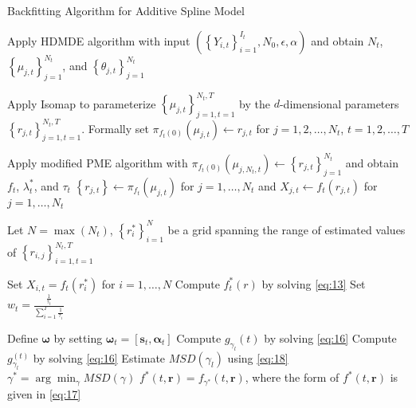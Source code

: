 \documentclass[11pt,reqno]{article}
\theoremstyle{definition}
\begin{document}
\begin{algorithm}
\caption{Backfitting Algorithm for Additive Spline Model}\label{alg:backfitting}

 {
  Apply HDMDE algorithm with input $\left(\left\{Y_{i, t}\right\}_{i = 1}^{I_t}, N_0, \epsilon, \alpha\right)$ and obtain $N_t$, $\left\{\mu_{j, t}\right\}_{j = 1}^{N_t}$, and $\left\{\theta_{j, t}\right\}_{j = 1}^{N_t}$\;
}

  Apply Isomap to parameterize $\left\{\mu_{j, t}\right\}_{j = 1, t = 1}^{N_t, T}$ by the $d$-dimensional parameters $\left\{r_{j, t}\right\}_{j = 1, t = 1}^{N_t, T}$. Formally set $\pi_{f_t(0)}(\mu_{j, t}) \gets r_{j, t}$ for $j = 1, 2, \dots, N_t$, $t = 1, 2, \dots, T$\;

  
 {
  Apply modified PME algorithm with $\pi_{f_t(0)}(\mu_{j, N_t, t}) \gets \left\{r_{j, t}\right\}_{j = 1}^{N_t}$ and obtain $f_t$, $\lambda_t^*$, and $\tau_t$\;
  $\left\{r_{j, t}\right\} \gets \pi_{f_t}(\mu_{j, t})$ for $j = 1, \dots, N_t$ and $X_{j, t} \gets f_t(r_{j, t})$ for $j = 1, \dots, N_t$\;
}

  Let $N = \max(N_t)$, $\left\{r_i^*\right\}_{i=1}^{N}$ be a grid spanning the range of estimated values of $\left\{r_{i, j}\right\}_{i=1, t=1}^{N_t, T}$\; 

 {
  Set $X_{i, t} = f_t(r_{i}^*)$ for $i = 1, \dots, N$\;
  Compute $f_t^*(r)$ by solving \eqref{eq:13}\;
  Set $w_t = \frac{\frac{1}{\tau_t}}{\sum_{i=1}^{T}\frac{1}{\tau_i}}$\;
}

  Define $\boldsymbol{\omega}$ by setting $\boldsymbol{\omega}_t = \left[\boldsymbol{s}_t, \boldsymbol{\alpha}_t\right]$\;
   {
    Compute $g_{\gamma_l}(t)$ by solving \eqref{eq:16}\;
     {
      Compute $g_{\gamma_l}^{(t)}$ by solving \eqref{eq:16}\;
    }
    Estimate $MSD(\gamma_l)$ using \eqref{eq:18}\;
  }
  $\gamma^* = \arg\min_{\gamma}MSD(\gamma)$\;
  $f^*(t, \boldsymbol{r}) = f_{\gamma^*}(t, \boldsymbol{r})$, where the form of $f^*(t, \boldsymbol{r})$ is given in \eqref{eq:17}
\end{algorithm}
\end{document}

